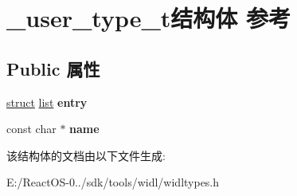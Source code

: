 \hypertarget{struct__user__type__t}{}\section{\+\_\+user\+\_\+type\+\_\+t结构体 参考}
\label{struct__user__type__t}
\subsection*{Public 属性}
\begin{DoxyCompactItemize}
\item 
\mbox{\label{struct__user__type__t_a1ca4d621cd1362e7aca5ded68ee0428e}} 
\hyperlink{interfacestruct}{struct} \hyperlink{classlist}{list} {\bfseries entry}
\item 
\mbox{\label{struct__user__type__t_a80dcf5b06773b43ee68f3cf85b19ae01}} 
const char $\ast$ {\bfseries name}
\end{DoxyCompactItemize}


该结构体的文档由以下文件生成\+:\begin{DoxyCompactItemize}
\item 
E\+:/\+React\+O\+S-\/0../sdk/tools/widl/widltypes.\+h\end{DoxyCompactItemize}
